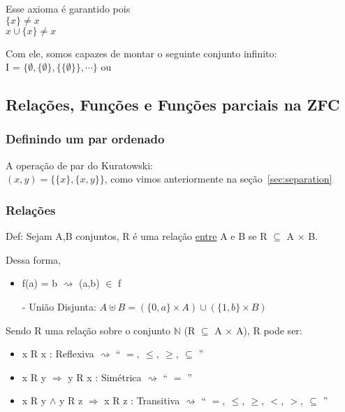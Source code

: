 \documentclass[12pt, a4paper]{article}
\begin{document}
				Esse axioma \'e garantido pois\\
				$\{x\} \ne x $\\
				$ x \cup \{x\} \ne x $

				Com ele, somos capazes de montar o seguinte conjunto infinito:\\
				I = $\{ \emptyset, \{\emptyset\}, \{\{\emptyset\}\}, \cdots \}$ ou\\


			\subsection{Rela\c{c}\~oes, Fun\c{c}\~oes e Fun\c{c}\~oes parciais na ZFC}
			\subsubsection{Definindo um par ordenado}
				A opera\c{c}\~ao de par do Kuratowski:\\
				$ (x, y) = \{ \{x\}, \{x, y\}\} $, como vimos anteriormente na se\c{c}\~ao~\ref{sec:separation}

			\subsubsection{Rela\c{c}\~oes}
				
				Def: Sejam A,B conjuntos, R \'e uma rela\c{c}\~ao \underline{entre} A e B se R $\subseteq$ A $\times$ B.

				Dessa forma, 
				\begin{itemize}
				\item f(a) = b $\rightsquigarrow$ (a,b) $\in$ f
				\end{itemize}

				\begin{itemize}
				\item[-] Uni\~ao Disjunta: $A \uplus B = (\{0,a\} \times A) \cup (\{1,b\} \times B)$				
				\end{itemize}

				Sendo R uma rela\c{c}\~ao sobre o conjunto $\mathbb{N}$ (R $\subseteq$ A $\times$ A), R pode ser:
				\begin{itemize}
				\item x R x : Reflexiva $\rightsquigarrow$ `` $ =, ~\leq, ~\geq, ~\subseteq $ ''
				\item x R y $\Rightarrow $ y R x  : Sim\'etrica $\rightsquigarrow$ `` $ = $  ''
				\item x R y $\land$ y R z $\Rightarrow$ x R z : Transitiva $\rightsquigarrow$  `` $ =, ~\leq, ~\geq, ~<, ~>, ~\subseteq $ ''
				\end{itemize}
\end{document}
